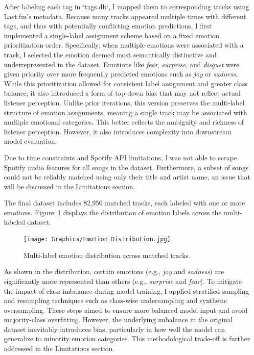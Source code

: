\documentclass{article}
\begin{document}
After labeling each tag in `tags.db`, I mapped them to corresponding tracks using Last.fm’s metadata. Because many tracks appeared multiple times with different tags, and thus with potentially conflicting emotion predictions, I first implemented a single-label assignment scheme based on a fixed emotion prioritization order. Specifically, when multiple emotions were associated with a track, I selected the emotion deemed most semantically distinctive and underrepresented in the dataset. Emotions like \textit{fear}, \textit{surprise}, and \textit{disgust} were given priority over more frequently predicted emotions such as \textit{joy} or \textit{sadness}. While this prioritization allowed for consistent label assignment and greater class balance, it also introduced a form of top-down bias that may not reflect actual listener perception. Unlike prior iterations, this version preserves the multi-label structure of emotion assignments, meaning a single track may be associated with multiple emotional categories. This better reflects the ambiguity and richness of listener perception. However, it also introduces complexity into downstream model evaluation.

Due to time constraints and Spotify API limitations, I was not able to scrape Spotify audio features for all songs in the dataset. Furthermore, a subset of songs could not be reliably matched using only their title and artist name, an issue that will be discussed in the Limitations section.

The final dataset includes 82,950 matched tracks, each labeled with one or more emotions. Figure~\ref{fig:emotion_dist} displays the distribution of emotion labels across the multi-labeled dataset.

\begin{figure}[H]
\centering
\texttt{[image: Graphics/Emotion Distribution.jpg]}
\caption{Multi-label emotion distribution across matched tracks.}
\label{fig:emotion_dist}
\end{figure}

As shown in the distribution, certain emotions (e.g., \textit{joy} and \textit{sadness}) are significantly more represented than others (e.g., \textit{surprise} and \textit{fear}). To mitigate the impact of class imbalance during model training, I applied stratified sampling and resampling techniques such as class-wise undersampling and synthetic oversampling. These steps aimed to ensure more balanced model input and avoid majority-class overfitting. However, the underlying imbalance in the original dataset inevitably introduces bias, particularly in how well the model can generalize to minority emotion categories. This methodological trade-off is further addressed in the Limitations section.
\end{document}
